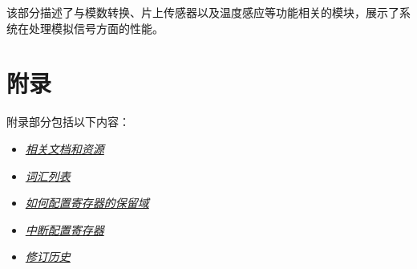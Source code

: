 \documentclass[openany, 10pt]{book}
\begin{document}

该部分描述了与模数转换、片上传感器以及温度感应等功能相关的模块，展示了系统在处理模拟信号方面的性能。




\part{附录}\label{appendix}

附录部分包括以下内容：

\begin{itemize}
    \item \hyperref[sec:resources]{\textit{相关文档和资源}}
    \item \hyperref[glossary]{\textit{词汇列表}}
    \item \hyperref[programming-reserved-field]{\textit{如何配置寄存器的保留域}}
    \item \hyperref[interrupt-config-registers]{\textit{中断配置寄存器}}
    \item \hyperref[revision-history]{\textit{修订历史}}
\end{itemize}



\clearpage


\clearpage


\clearpage


\clearpage


\clearpage


\clearpage

\end{document}
